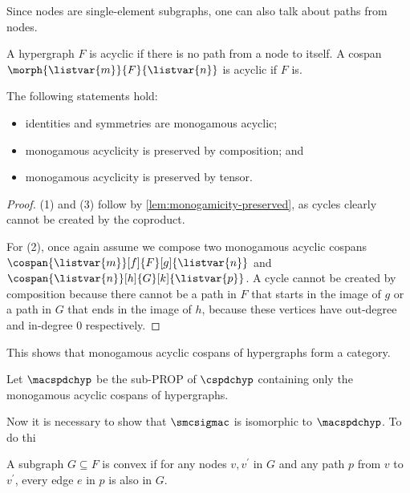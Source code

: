 Since nodes are single-element subgraphs, one can also talk about paths from
nodes.

\begin{definition}
    A hypergraph \(F\) is acyclic if there is no path from a node to itself.
    A cospan \(\morph{\listvar{m}}{F}{\listvar{n}}\) is acyclic if \(F\) is.
\end{definition}

\begin{lemma}
    \label{lem:monogamous-acyclic-preserved}
    The following statements hold:
    \begin{itemize}
        \item identities and symmetries are monogamous acyclic;
        \item monogamous acyclicity is preserved by composition; and
        \item monogamous acyclicity is preserved by tensor.
    \end{itemize}
\end{lemma}
\begin{proof}
    (1) and (3) follow by \cref{lem:monogamicity-preserved}, as cycles clearly
    cannot be created by the coproduct.

    For (2), once again assume we compose two monogamous acyclic cospans \(
        \cospan{\listvar{m}}[f]{F}[g]{\listvar{n}}
    \) and \(
        \cospan{\listvar{n}}[h]{G}[k]{\listvar{p}}
    \).
    A cycle cannot be created by composition because there cannot be a path in
    \(F\) that starts in the image of \(g\) or a path in \(G\) that ends in the
    image of \(h\), because these vertices have out-degree and in-degree \(0\)
    respectively.
\end{proof}

This shows that monogamous acyclic cospans of hypergraphs form a category.

\begin{definition}
    Let \(\macspdchyp\) be the sub-PROP of \(\cspdchyp\) containing only the
    monogamous acyclic cospans of hypergraphs.
\end{definition}

Now it is necessary to show that \(\smcsigmac\) is isomorphic to
\(\macspdchyp\).
To do thi


\begin{definition}
    A subgraph \(G \subseteq F\) is convex if for any nodes \(v, v^\prime\) in
    \(G\) and any path \(p\) from \(v\) to \(v^\prime\), every edge \(e\) in
    \(p\) is also in \(G\).
\end{definition}

